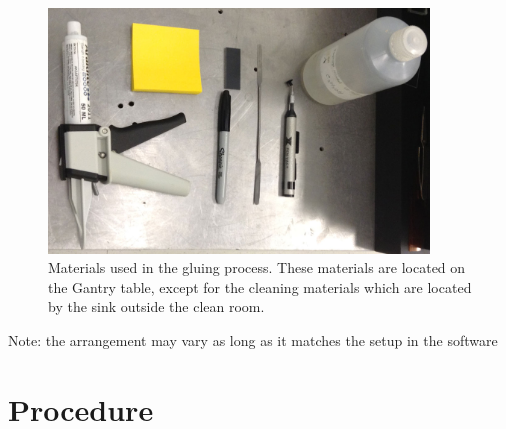 \documentclass[12pt]{unlsilabsop}
\begin{document}
\begin{center}
\begin{figure}[h]
\includegraphics[width=0.9\textwidth]{img/gluingMaterials.jpg}
\caption{Materials used in the gluing process. These materials are located on the Gantry table, except for the cleaning materials which are located by the sink outside the clean room.}
\label{materials}
\end{figure}
\end{center}


Note: the arrangement may vary as long as it matches the setup in the software

\section{Procedure}
\end{document}
